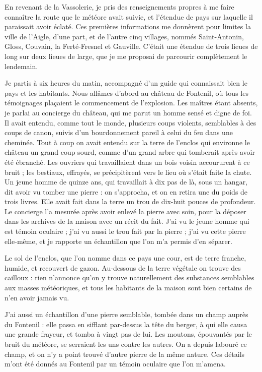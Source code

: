 \documentclass[a4paper, 11pt, oneside, polutonikogreek, french]{article}
\begin{document}
En revenant de la Vassolerie, je pris des renseignements propres à me faire connaître la route que le météore avait suivie, et l'étendue de pays sur laquelle il paraissait avoir éclaté. Ces premières informations me donnèrent pour limites la ville de l'Aigle, d'une part, et de l'autre cinq villages, nommés Saint-Antonin, Gloss, Couvain, la Ferté-Fresnel et Gauville. C'était une étendue de trois lieues de long sur deux lieues de large, que je me proposai de parcourir complètement le lendemain.

Je partis à six heures du matin, accompagné d'un guide qui connaissait bien le pays et les habitants. Nous allâmes d'abord au château de Fontenil, où tous les témoignages plaçaient le commencement de l'explosion. Les maîtres étant absents, je parlai au concierge du château, qui me parut un homme sensé et digne de foi. Il avait entendu, comme tout le monde, plusieurs coups violents, semblables à des coups de canon, suivis d'un bourdonnement pareil à celui du feu dans une cheminée. Tout à coup on avait entendu sur la terre de l'enclos qui environne le château un grand coup sourd, comme d'un grand arbre qui tomberait après avoir été ébranché. Les ouvriers qui travaillaient dans un bois voisin accoururent à ce bruit ; les bestiaux, effrayés, se précipitèrent vers le lieu où s'était faite la chute. Un jeune homme de quinze ans, qui travaillait à dix pas de là, sous un hangar, dit avoir vu tomber une pierre : on s'approcha, et on en retira une du poids de trois livres. Elle avait fait dans la terre un trou de dix-huit pouces de profondeur. Le concierge l'a mesurée après avoir enlevé la pierre avec soin, pour la déposer dans les archives de la maison avec un récit du fait. J'ai vu le jeune homme qui est témoin oculaire ; j'ai vu aussi le trou fait par la pierre ; j'ai vu cette pierre elle-même, et je rapporte un échantillon que l'on m'a permis d'en séparer.

Le sol de l'enclos, que l'on nomme dans ce pays une cour, est de terre franche, humide, et recouvert de gazon. Au-dessous de la terre végétale on trouve des cailloux : rien n'annonce qu'on y trouve naturellement des substances semblables aux masses météoriques, et tous les habitants de la maison sont bien certains de n'en avoir jamais vu.

J'ai aussi un échantillon d'une pierre semblable, tombée dans un champ auprès du Fontenil : elle passa en sifflant par-dessus la tête du berger, à qui elle causa une grande frayeur, et tomba à vingt pas de lui. Les moutons, épouvantés par le bruit du météore, se serraient les uns contre les autres. On a depuis labouré ce champ, et on n'y a point trouvé d'autre pierre de la même nature. Ces détails m'ont été donnés au Fontenil par un témoin oculaire que l'on m'amena.
\end{document}
